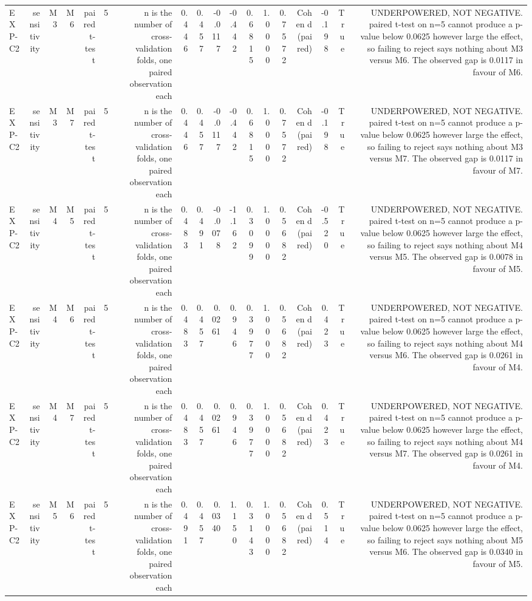 \begin{table}[htbp]
\begin{tabular}{lrrrrrrrrrrrrrrrrr}
    EXP-C2 & sensitivity & M3 & M6 & paired t-test & 5 & n is the number of cross-validation folds, one paired observation each & 0.446 & 0.457 & -0.0117 & -0.442 & 0.6815 & 1.0000 & 0.7572 & Cohen d (paired) & -0.198 & True & UNDERPOWERED, NOT NEGATIVE. paired t-test on n=5 cannot produce a p-value below 0.0625 however large the effect, so failing to reject says nothing about M3 versus M6. The observed gap is 0.0117 in favour of M6. \\
    EXP-C2 & sensitivity & M3 & M7 & paired t-test & 5 & n is the number of cross-validation folds, one paired observation each & 0.446 & 0.457 & -0.0117 & -0.442 & 0.6815 & 1.0000 & 0.7572 & Cohen d (paired) & -0.198 & True & UNDERPOWERED, NOT NEGATIVE. paired t-test on n=5 cannot produce a p-value below 0.0625 however large the effect, so failing to reject says nothing about M3 versus M7. The observed gap is 0.0117 in favour of M7. \\
    EXP-C2 & sensitivity & M4 & M5 & paired t-test & 5 & n is the number of cross-validation folds, one paired observation each & 0.483 & 0.491 & -0.0078 & -1.162 & 0.3099 & 1.0000 & 0.5682 & Cohen d (paired) & -0.520 & True & UNDERPOWERED, NOT NEGATIVE. paired t-test on n=5 cannot produce a p-value below 0.0625 however large the effect, so failing to reject says nothing about M4 versus M5. The observed gap is 0.0078 in favour of M5. \\
    EXP-C2 & sensitivity & M4 & M6 & paired t-test & 5 & n is the number of cross-validation folds, one paired observation each & 0.483 & 0.457 & 0.0261 & 0.946 & 0.3977 & 1.0000 & 0.5682 & Cohen d (paired) & 0.423 & True & UNDERPOWERED, NOT NEGATIVE. paired t-test on n=5 cannot produce a p-value below 0.0625 however large the effect, so failing to reject says nothing about M4 versus M6. The observed gap is 0.0261 in favour of M4. \\
    EXP-C2 & sensitivity & M4 & M7 & paired t-test & 5 & n is the number of cross-validation folds, one paired observation each & 0.483 & 0.457 & 0.0261 & 0.946 & 0.3977 & 1.0000 & 0.5682 & Cohen d (paired) & 0.423 & True & UNDERPOWERED, NOT NEGATIVE. paired t-test on n=5 cannot produce a p-value below 0.0625 however large the effect, so failing to reject says nothing about M4 versus M7. The observed gap is 0.0261 in favour of M4. \\
    EXP-C2 & sensitivity & M5 & M6 & paired t-test & 5 & n is the number of cross-validation folds, one paired observation each & 0.491 & 0.457 & 0.0340 & 1.150 & 0.3143 & 1.0000 & 0.5682 & Cohen d (paired) & 0.514 & True & UNDERPOWERED, NOT NEGATIVE. paired t-test on n=5 cannot produce a p-value below 0.0625 however large the effect, so failing to reject says nothing about M5 versus M6. The observed gap is 0.0340 in favour of M5. \\

\end{tabular}
\end{table}
